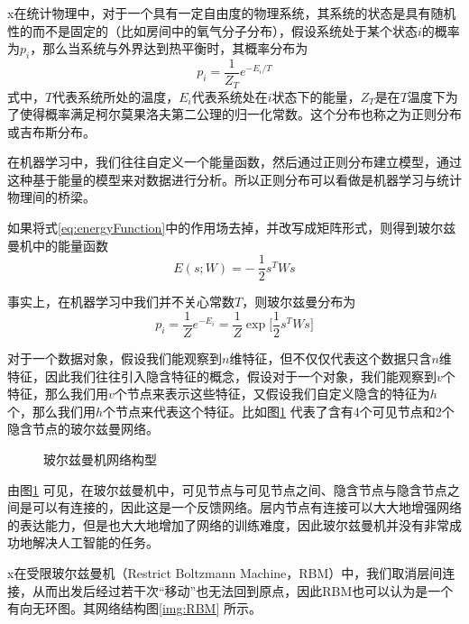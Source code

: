 x在统计物理中，对于一个具有一定自由度的物理系统，其系统的状态是具有随机性的而不是固定的（比如房间中的氧气分子分布），假设系统处于某个状态$i$的概率为$p_i$，那么当系统与外界达到热平衡时，其概率分布为
\begin{equation}\label{zhengzefenbu}
p_i = \frac{1}{Z_T} e^{-E_i / T}
\end{equation}
式中，$T$代表系统所处的温度，$E_i$代表系统处在$i$状态下的能量，$Z_T$是在$T$温度下为了使得概率满足柯尔莫果洛夫第二公理的归一化常数。这个分布也称之为正则分布或吉布斯分布。

在机器学习中，我们往往自定义一个能量函数，然后通过正则分布建立模型，通过这种基于能量的模型来对数据进行分析。所以正则分布可以看做是机器学习与统计物理间的桥梁。

如果将式\eqref{eq:energyFunction}中的作用场去掉，并改写成矩阵形式，则得到玻尔兹曼机中的能量函数
\begin{equation}
E(s; W) = -~\frac{1}{2} s^TWs
\end{equation}

事实上，在机器学习中我们并不关心常数$T$，则玻尔兹曼分布为
\begin{equation}
p_i = \frac{1}{Z} e^{-E_i}= \frac{1}{Z} \exp\Big[\frac{1}{2} s^TWs\Big]
\end{equation}

对于一个数据对象，假设我们能观察到$n$维特征，但不仅仅代表这个数据只含$n$维特征，因此我们往往引入隐含特征的概念，假设对于一个对象，我们能观察到$v$个特征，那么我们用$v$个节点来表示这些特征，又假设我们自定义隐含的特征为$h$个，那么我们用$h$个节点来代表这个特征。比如图\ref{img:BM} 代表了含有4个可见节点和2个隐含节点的玻尔兹曼网络。
\begin{figure}[htbp]
\centering
\subfigure{\label{BM1}}\addtocounter{subfigure}{-2}
\subfigure{\label{BM2}}\addtocounter{subfigure}{-2}
\caption{玻尔兹曼机网络构型}
\label{img:BM}
\vspace{-1em}
\end{figure}

由图\ref{img:BM} 可见，在玻尔兹曼机中，可见节点与可见节点之间、隐含节点与隐含节点之间是可以有连接的，因此这是一个反馈网络。层内节点有连接可以大大地增强网络的表达能力，但是也大大地增加了网络的训练难度，因此玻尔兹曼机并没有非常成功地解决人工智能的任务。

x在受限玻尔兹曼机（Restrict  Boltzmann Machine，RBM）中，我们取消层间连接，从而出发后经过若干次“移动”也无法回到原点，因此RBM也可以认为是一个有向无环图。其网络结构图\ref{img:RBM} 所示。

